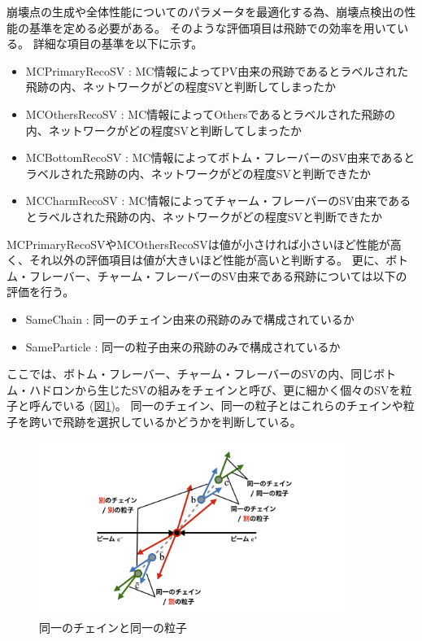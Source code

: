 崩壊点の生成や全体性能についてのパラメータを最適化する為、崩壊点検出の性能の基準を定める必要がある。
そのような評価項目は飛跡での効率を用いている。
詳細な項目の基準を以下に示す。

\begin{itemize}
 \item MCPrimaryRecoSV : MC情報によってPV由来の飛跡であるとラベルされた飛跡の内、ネットワークがどの程度SVと判断してしまったか
 \item MCOthersRecoSV : MC情報によってOthersであるとラベルされた飛跡の内、ネットワークがどの程度SVと判断してしまったか
 \item MCBottomRecoSV : MC情報によってボトム・フレーバーのSV由来であるとラベルされた飛跡の内、ネットワークがどの程度SVと判断できたか
 \item MCCharmRecoSV : MC情報によってチャーム・フレーバーのSV由来であるとラベルされた飛跡の内、ネットワークがどの程度SVと判断できたか
\end{itemize}

MCPrimaryRecoSVやMCOthersRecoSVは値が小さければ小さいほど性能が高く、それ以外の評価項目は値が大きいほど性能が高いと判断する。
更に、ボトム・フレーバー、チャーム・フレーバーのSV由来である飛跡については以下の評価を行う。

\begin{itemize}
 \item SameChain : 同一のチェイン由来の飛跡のみで構成されているか
 \item SameParticle : 同一の粒子由来の飛跡のみで構成されているか
\end{itemize}

ここでは、ボトム・フレーバー、チャーム・フレーバーのSVの内、同じボトム・ハドロンから生じたSVの組みをチェインと呼び、更に細かく個々のSVを粒子と呼んでいる (図\ref{4-2-0-2SameChainSameParticle})。
同一のチェイン、同一の粒子とはこれらのチェインや粒子を跨いで飛跡を選択しているかどうかを判断している。

\begin{figure}[htbp]
 \centering
 \includegraphics[width=0.9\textwidth, clip]{Figure/4VertexFinderwithDL/4-2-0-2SameChainSameParticle.png}
 \caption{同一のチェインと同一の粒子}
 \label{4-2-0-2SameChainSameParticle}
\end{figure}

